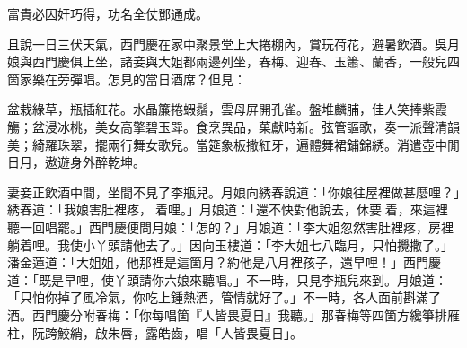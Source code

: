 \begin{myquote}
富貴必因奸巧得，功名全仗鄧通成。
\end{myquote}

且說一日三伏天氣，西門慶在家中聚景堂上大捲棚內，賞玩荷花，避暑飲酒。吳月娘與西門慶俱上坐，諸妾與大姐都兩邊列坐，春梅、迎春、玉簫、蘭香，一般兒四箇家樂在旁彈唱。怎見的當日酒席？但見：

\begin{myquote}
盆栽綠草，瓶插紅花。水晶簾捲蝦鬚，雲母屏開孔雀。盤堆麟脯，佳人笑捧紫霞觴；盆浸冰桃，美女高擎碧玉斝。食烹異品，菓獻時新。弦管謳歌，奏一派聲清韻美；綺羅珠翠，擺兩行舞女歌兒。當筵象板撒紅牙，遍體舞裙鋪錦綉。消遣壺中閒日月，遨遊身外醉乾坤。
\end{myquote}

妻妾正飲酒中間，坐間不見了李瓶兒。月娘向綉春說道：「你娘往屋裡做甚麼哩？」綉春道：「我娘害肚裡疼，𢱉着哩。」月娘道：「還不快對他說去，休要𢱉着，來這裡聽一回唱罷。」西門慶便問月娘：「怎的？」月娘道：「李大姐忽然害肚裡疼，房裡躺着哩。我使小丫頭請他去了。」因向玉樓道：「李大姐七八臨月，只怕攪撒了。」潘金蓮道：「大姐姐，他那裡是這箇月？約他是八月裡孩子，還早哩！」西門慶道：「既是早哩，使丫頭請你六娘來聽唱。」不一時，只見李瓶兒來到。月娘道：「只怕你掉了風冷氣，你吃上鍾熱酒，管情就好了。」不一時，各人面前斟滿了酒。西門慶分咐春梅：「你每唱箇『人皆畏夏日』我聽。」那春梅等四箇方纔箏排雁柱，阮跨鮫綃，啟朱唇，露皓齒，唱「人皆畏夏日」。

